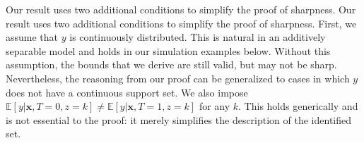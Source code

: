 Our result uses two additional conditions to simplify the proof of sharpness.
Our result uses two additional conditions to simplify the proof of sharpness.
First, we assume that $y$ is continuously distributed.
This is natural in an additively separable model and holds in our simulation examples below. 
Without this assumption, the bounds that we derive are still valid, but may not be sharp. 
Nevertheless, the reasoning from our proof can be generalized to cases in which $y$ does not have a continuous support set.
We also impose $\mathbb{E}[y|\mathbf{x},T = 0, z=k] \neq \mathbb{E}[y|\mathbf{x},T=1, z=k]$ for any $k$.
This holds generically and is not essential to the proof: it merely simplifies the description of the identified set.




